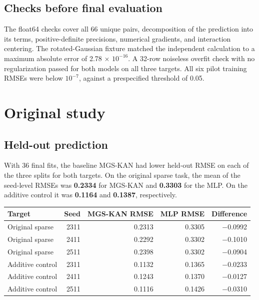\documentclass[11pt]{article}
\numberwithin{equation}{section}
\begin{document}
\subsection{Checks before final evaluation}

The float64 checks cover all 66 unique pairs, decomposition of the prediction into its terms,
positive-definite precisions, numerical gradients, and interaction centering. The
rotated-Gaussian fixture matched the independent calculation to a maximum absolute error of
2.78 \ensuremath{\times} \(10^{-16}\). A 32-row noiseless overfit check with no regularization
passed for both models on all three targets. All six pilot training RMSEs were below
\(10^{-7}\), against a prespecified threshold of 0.05.

\section{Original study}

\subsection{Held-out prediction}

With 36 final fits, the baseline MGS-KAN had lower held-out RMSE on each of the three splits
for both targets. On the original sparse task, the mean of the seed-level RMSEs was
\textbf{0.2334} for MGS-KAN and \textbf{0.3303} for the MLP. On the additive control it was
\textbf{0.1164} and \textbf{0.1387}, respectively.

\begin{center}
\small
\begin{tabularx}{\linewidth}{@{} Y r r r r @{}}
\toprule
\textbf{Target} & \textbf{Seed} & \textbf{MGS-KAN RMSE} & \textbf{MLP RMSE} & \textbf{Difference} \\
\midrule
Original sparse & 2311 & 0.2313 & 0.3305 & \ensuremath{-}0.0992 \\
Original sparse & 2411 & 0.2292 & 0.3302 & \ensuremath{-}0.1010 \\
Original sparse & 2511 & 0.2398 & 0.3302 & \ensuremath{-}0.0904 \\
Additive control & 2311 & 0.1132 & 0.1365 & \ensuremath{-}0.0233 \\
Additive control & 2411 & 0.1243 & 0.1370 & \ensuremath{-}0.0127 \\
Additive control & 2511 & 0.1116 & 0.1426 & \ensuremath{-}0.0310 \\
\bottomrule
\end{tabularx}
\end{center}
\end{document}
